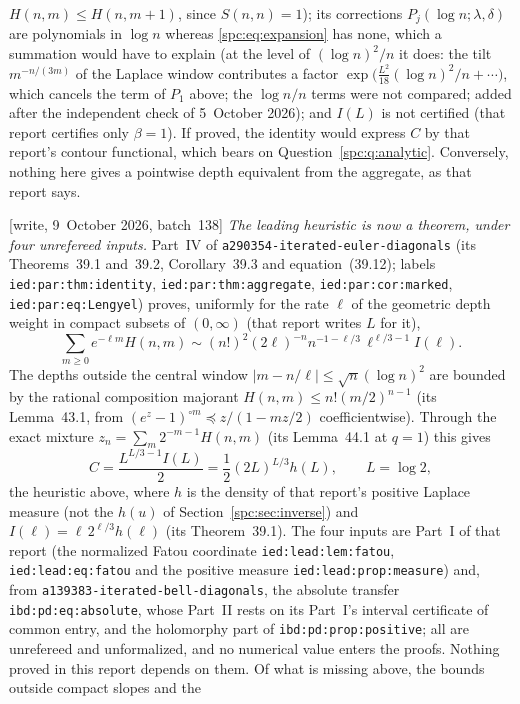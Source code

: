 \documentclass[11pt,letterpaper]{article}
\theoremstyle{definition}\newtheorem{definition}[theorem]{Definition}
\theoremstyle{remark}\newtheorem{remark}[theorem]{Remark}
\newcommand{\file}[1]{\nolinkurl{#1}}
\begin{document}
\begin{enumerate}
 $H(n,m)\le H(n,m+1)$, since $S(n,n)=1$); its corrections
 $P_j(\log n;\lambda,\delta)$ are polynomials in $\log n$ whereas
 \eqref{spc:eq:expansion} has none, which a summation would have to explain
 (at the level of $(\log n)^2/n$ it does: the tilt $m^{-n/(3m)}$ of the
 Laplace window contributes a factor
 $\exp\bigl(\tfrac{L^2}{18}(\log n)^2/n+\cdots\bigr)$, which cancels the
 term of $P_1$ above; the $\log n/n$ terms were not compared; added after
 the independent check of 5~October 2026);
 and $I(L)$ is not certified (that report certifies only $\beta=1$). If
 proved, the identity would express $C$ by that report's contour functional,
 which bears on Question~\ref{spc:q:analytic}. Conversely, nothing here gives
 a pointwise depth equivalent from the aggregate, as that report says.

 \textup{[write, 9~October 2026, batch~138]} \emph{The leading heuristic is
 now a theorem, under four unrefereed inputs.} Part~IV of
 \file{a290354-iterated-euler-diagonals} (its Theorems~39.1 and~39.2,
 Corollary~39.3 and equation~(39.12); labels \file{ied:par:thm:identity},
 \file{ied:par:thm:aggregate}, \file{ied:par:cor:marked},
 \file{ied:par:eq:Lengyel}) proves, uniformly for the rate $\ell$ of the
 geometric depth weight in compact subsets of $(0,\infty)$ (that report
 writes $L$ for it),
 \[
  \sum_{m\ge0}e^{-\ell m}H(n,m)\sim(n!)^2(2\ell)^{-n}n^{-1-\ell/3}
  \,\ell^{\ell/3-1}I(\ell).
 \]
 The depths outside the central window $|m-n/\ell|\le\sqrt n(\log n)^2$ are
 bounded by the rational composition majorant $H(n,m)\le n!(m/2)^{n-1}$ (its
 Lemma~43.1, from $(e^z-1)^{\circ m}\preceq z/(1-mz/2)$ coefficientwise).
 Through the exact mixture $z_n=\sum_m2^{-m-1}H(n,m)$ (its Lemma~44.1 at
 $q=1$) this gives
 \[
  C=\frac{L^{L/3-1}I(L)}2=\frac12(2L)^{L/3}h(L),\qquad L=\log2,
 \]
 the heuristic above, where $h$ is the density of that report's positive
 Laplace measure (not the $h(u)$ of Section~\ref{spc:sec:inverse}) and
 $I(\ell)=\ell\,2^{\ell/3}h(\ell)$ (its Theorem~39.1). The four inputs are
 Part~I of that report (the normalized Fatou coordinate
 \file{ied:lead:lem:fatou}, \file{ied:lead:eq:fatou} and the positive measure
 \file{ied:lead:prop:measure}) and, from
 \file{a139383-iterated-bell-diagonals}, the absolute transfer
 \file{ibd:pd:eq:absolute}, whose Part~II rests on its Part~I's interval
 certificate of common entry, and the holomorphy part of
 \file{ibd:pd:prop:positive}; all are unrefereed and unformalized, and no
 numerical value enters the proofs. Nothing proved in this report depends on
 them. Of what is missing above, the bounds outside compact slopes and the

\end{enumerate}
\end{document}
